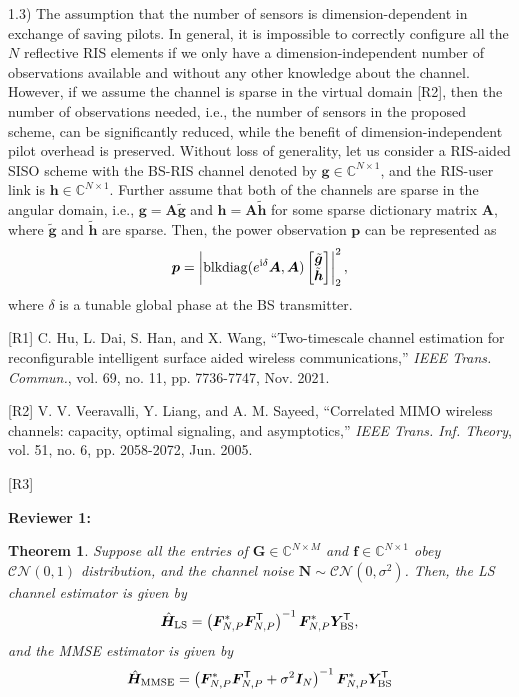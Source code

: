 \documentclass[a4paper,12pt]{article}
\newtheorem{theorem}{\bf Theorem}
\def \T {^{\mathsf{T}}}
\def \ri {{\rm i}}
\begin{document}
{{1.3) The assumption that the number of sensors is dimension-dependent in exchange of saving pilots. In general, it is impossible to correctly configure all the $N$ reflective RIS elements if we only have a dimension-independent number of observations available and without any other knowledge about the channel. However, if we assume the channel is sparse in the virtual domain [R2], then the number of observations needed, i.e., the number of sensors in the proposed scheme, can be significantly reduced, while the benefit of dimension-independent pilot overhead is preserved. Without loss of generality, let us consider a RIS-aided SISO scheme with the BS-RIS channel denoted by ${\bm g}\in\mathbb{C}^{N\times 1}$, and the RIS-user link is ${\bm h}\in\mathbb{C}^{N\times 1}$. Further assume that both of the channels are sparse in the angular domain, i.e., ${\bm g} = {\bm A}\tilde{\bm g}$ and ${\bm h} = {\bm A}\tilde{\bm h}$ for some sparse dictionary matrix ${\bm A}$, where $\tilde{\bm g}$ and $\tilde{\bm h}$ are sparse. Then, the power observation $\bm p$ can be represented as 
\begin{equation}
    {\bm p} = \left|{\rm blkdiag}(e^{\ri \delta}{\bm A}, {\bm A}) \begin{bmatrix} \tilde{\bm g} \\ \tilde{\bm h}\end{bmatrix} \right|_2^2,
\end{equation}
where $\delta$ is a tunable global phase at the BS transmitter. 


[R1] C. Hu, L. Dai, S. Han, and X. Wang, ``Two-timescale channel estimation for  reconfigurable intelligent  surface  aided  wireless  communications,'' {\it IEEE Trans. Commun.}, vol. 69, no. 11, pp. 7736-7747, Nov. 2021.

[R2] V. V. Veeravalli, Y. Liang, and A. M. Sayeed, ``Correlated MIMO wireless channels: capacity, optimal signaling, and asymptotics,'' {\it IEEE Trans. Inf. Theory}, vol. 51, no. 6, pp. 2058-2072, Jun. 2005. 

[R3]

}}

\textbf{Reviewer 1:}




\begin{theorem} 
    Suppose all the entries of ${\bm G}\in\mathbb{C}^{N\times M}$ and ${\bm f}\in\mathbb{C}^{N\times 1}$ obey ${\mathcal{CN}(0,1)}$ distribution, and the channel noise ${\bm N}\sim \mathcal{CN}(0,\sigma^2)$. 
    Then, the LS channel estimator is given by 
    \begin{equation}
        \hat{\bm{H}}_{\rm LS} = \left( {\bm F}_{N,P}^{*} {\bm F_{N,P}\T} \right)^{-1}{\bm F}_{N,P}^{*}{\bm Y}_{\rm BS}\T,
    \end{equation}
    and the MMSE estimator is given by 
    \begin{equation}
        \hat{\bm{H}}_{\rm MMSE} = \left( {\bm F}_{N,P}^{*} {\bm F_{N,P}\T + \sigma^2 {\bm I}_N} \right)^{-1}{\bm F}_{N,P}^{*}{\bm Y}_{\rm BS}\T
    \end{equation}
\end{theorem}
\end{document}
